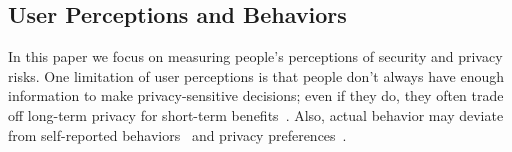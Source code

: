 \subsection{User Perceptions and Behaviors}
In this paper we focus on measuring people's perceptions of security and privacy risks.
One limitation of user perceptions is that people don't always have enough information to make privacy-sensitive decisions; even if they do, they often trade off long-term privacy for short-term benefits~\cite{acquisti2005privacy}. Also, actual behavior may deviate from self-reported behaviors~\cite{jensen2005privacy} and privacy preferences~\cite{spiekermann2001privacy}. 
